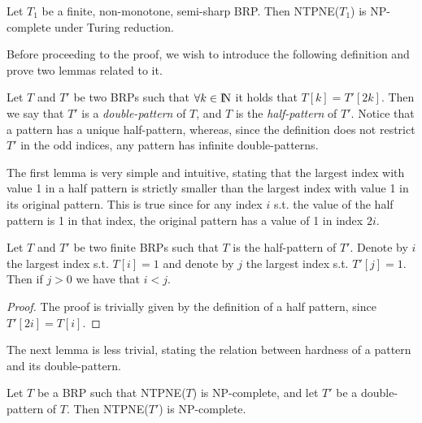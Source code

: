 \documentclass[runningheads]{llncs}
\begin{document}
\begin{theorem}
\label{thrm_all_semi_shrp}
Let $T_1$ be a finite, non-monotone, semi-sharp BRP. Then NTPNE($T_1$) is NP-complete under Turing reduction.
\end{theorem}

Before proceeding to the proof, we wish to introduce the following definition and prove two lemmas related to it.

\begin{definition}
Let $T$ and $T'$ be two BRPs such that $\forall k\in {\rm I\!N}$ it holds that $T[k]=T'[2k]$. Then we say that $T'$ is a \textit{double-pattern} of $T$, and $T$ is the \textit{half-pattern} of $T'$. Notice that a pattern has a unique half-pattern, whereas, since the definition does not restrict $T'$ in the odd indices, any pattern has infinite double-patterns.
\end{definition}

The first lemma is very simple and intuitive, stating that the largest index with value 1 in a half pattern is strictly smaller than the largest index with value 1 in its original pattern. This is true since for any index $i$ s.t. the value of the half pattern is 1 in that index, the original pattern has a value of 1 in index $2i$.

\begin{lemma}
\label{lem_half_reaches_best_shot}
Let $T$ and $T'$ be two finite BRPs such that $T$ is the half-pattern of $T'$. Denote by $i$ the largest index s.t. $T[i]=1$ and denote by $j$ the largest index s.t. $T'[j]=1$. Then if $j>0$ we have that $i<j$.
\end{lemma}

\begin{proof}
The proof is trivially given by the definition of a half pattern, since $T'[2i]=T[i]$.
\end{proof}

The next lemma is less trivial, stating the relation between hardness of a pattern and its double-pattern.
\begin{lemma}
\label{lem_double_pat}
Let $T$ be a BRP such that NTPNE($T$) is NP-complete, and let $T'$ be a double-pattern of $T$. Then NTPNE($T'$) is NP-complete.
\end{lemma}
\end{document}
